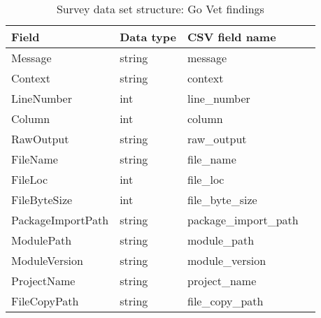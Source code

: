 \begin{table}[h]
    \centering
    \caption{Survey data set structure: Go Vet findings}
    \label{tbl:datastructure-vet-findings}
    \begin{tabular}{llll}
        \toprule
        Field & Data type & CSV field name \\
        \midrule
        Message              & string & message \\
        Context              & string & context \\
        LineNumber           & int    & line\_number \\
        Column               & int    & column \\
        RawOutput            & string & raw\_output \\
        FileName             & string & file\_name \\
        FileLoc              & int    & file\_loc \\
        FileByteSize         & int    & file\_byte\_size \\
        PackageImportPath    & string & package\_import\_path \\
        ModulePath           & string & module\_path \\
        ModuleVersion        & string & module\_version \\
        ProjectName          & string & project\_name \\
        FileCopyPath         & string & file\_copy\_path \\
        \bottomrule
    \end{tabular}
\end{table}

